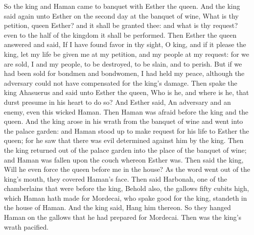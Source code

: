 So the king and Haman came to banquet with Esther the queen. And the king said again unto Esther on the second day at the banquet of wine, What is thy petition, queen Esther? and it shall be granted thee: and what is thy request? even to the half of the kingdom it shall be performed. Then Esther the queen answered and said, If I have found favor in thy sight, O king, and if it please the king, let my life be given me at my petition, and my people at my request: for we are sold, I and my people, to be destroyed, to be slain, and to perish. But if we had been sold for bondmen and bondwomen, I had held my peace, although the adversary could not have compensated for the king’s damage. Then spake the king Ahasuerus and said unto Esther the queen, Who is he, and where is he, that durst presume in his heart to do so? And Esther said, An adversary and an enemy, even this wicked Haman. Then Haman was afraid before the king and the queen. And the king arose in his wrath from the banquet of wine and went into the palace garden: and Haman stood up to make request for his life to Esther the queen; for he saw that there was evil determined against him by the king. Then the king returned out of the palace garden into the place of the banquet of wine; and Haman was fallen upon the couch whereon Esther was. Then said the king, Will he even force the queen before me in the house? As the word went out of the king’s mouth, they covered Haman’s face. Then said Harbonah, one of the chamberlains that were before the king, Behold also, the gallows fifty cubits high, which Haman hath made for Mordecai, who spake good for the king, standeth in the house of Haman. And the king said, Hang him thereon. So they hanged Haman on the gallows that he had prepared for Mordecai. Then was the king’s wrath pacified. 

